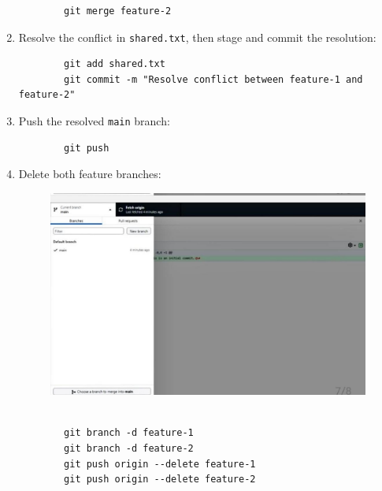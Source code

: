 \documentclass[a4paper,12pt]{article}
\begin{document}
\begin{enumerate}
        \begin{verbatim}
        git merge feature-2
        \end{verbatim}
    \item Resolve the conflict in \texttt{shared.txt}, then stage and commit the resolution:
        \begin{verbatim}
        git add shared.txt
        git commit -m "Resolve conflict between feature-1 and feature-2"
        \end{verbatim}
    \item Push the resolved \texttt{main} branch:
        \begin{verbatim}
        git push
        \end{verbatim}
    \item Delete both feature branches:
     \vspace{1 cm}
\begin{figure}[h!]
   \centering
    \includegraphics[width=0.5\linewidth]{Delete.jpg}
\end{figure}
\vspace{0.5 cm}
        \begin{verbatim}
        
        git branch -d feature-1
        git branch -d feature-2
        git push origin --delete feature-1
        git push origin --delete feature-2
        \end{verbatim}
\end{enumerate}
\end{document}
